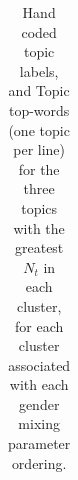 \documentclass{pnastwo}
\begin{document}
\begin{article}
\begin{table}
\begin{tabular}{lm{}|lm{}}
		\bottomrule
	\end{tabular}
	\caption{\label{tab:top words for each pattern} Hand coded topic labels, and Topic top-words (one topic per line) for the three topics with the greatest $N_t$ in each cluster, for each cluster associated with each gender mixing parameter ordering.}
\end{table}


\end{article}
\end{document}
